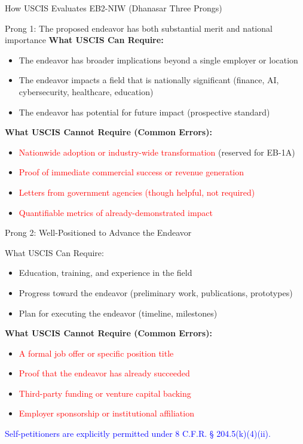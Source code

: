 \documentclass[11pt]{beamer}
\begin{document}
	
	\begin{frame}{How USCIS Evaluates EB2-NIW (Dhanasar Three Prongs)}
		\scriptsize
		\begin{block}{Prong 1: The proposed endeavor has both substantial merit and national importance}
			\textbf{What USCIS Can Require:}
			\begin{itemize}
				\item The endeavor has broader implications beyond a single employer or location
				\item The endeavor impacts a field that is nationally significant (finance, AI, cybersecurity, healthcare, education)
				\item The endeavor has potential for future impact (prospective standard)
			\end{itemize}
			\textbf{What USCIS Cannot Require (Common Errors):}
			\begin{itemize}
				\item \textcolor{red}{Nationwide adoption or industry-wide transformation} (reserved for EB-1A)
				\item \textcolor{red}{Proof of immediate commercial success or revenue generation}
				\item \textcolor{red}{Letters from government agencies (though helpful, not required)}
				\item \textcolor{red}{Quantifiable metrics of already-demonstrated impact}
			\end{itemize}
		\end{block}
	\end{frame}
	
	\begin{frame}{Prong 2: Well-Positioned to Advance the Endeavor}
		\scriptsize
		\begin{block}{What USCIS Can Require:}
			\begin{itemize}
				\item Education, training, and experience in the field
				\item Progress toward the endeavor (preliminary work, publications, prototypes)
				\item Plan for executing the endeavor (timeline, milestones)
			\end{itemize}
			\textbf{What USCIS Cannot Require (Common Errors):}
			\begin{itemize}
				\item \textcolor{red}{A formal job offer or specific position title}
				\item \textcolor{red}{Proof that the endeavor has already succeeded}
				\item \textcolor{red}{Third-party funding or venture capital backing}
				\item \textcolor{red}{Employer sponsorship or institutional affiliation}
			\end{itemize}
			\textcolor{blue}{Self-petitioners are explicitly permitted under 8 C.F.R. § 204.5(k)(4)(ii).}
		\end{block}
	\end{frame}
	
\end{document}
